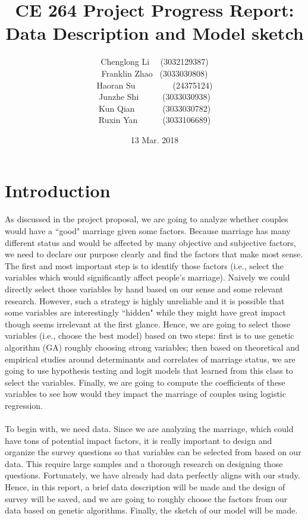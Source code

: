 \documentclass[12pt]{article}
\title{CE 264 Project Progress Report:\\ Data Description and Model sketch}
\date{13 Mar. 2018}
\author{Chenglong Li \ \ (3032129387)\\Franklin Zhao \ (3033030808)\\Haoran Su\ \ \ \ \ \ \ \ \   (24375124)\\Junzhe Shi \ \ \ \ \ (3033030938)\\Kun Qian \ \ \ \ \ \ (3033030782)\\Ruxin Yan\ \ \ \ \ \ (3033106689)}
\begin{document}
	
	\maketitle
	\renewcommand\theequation{\arabic{equation}}
	\renewcommand{\figurename}{Fig.}
	\onehalfspacing
	
	\section{Introduction}
	As discussed in the project proposal, we are going to analyze whether couples would have a ``good" marriage given some factors. Because marriage has many different status and would be affected by many objective and subjective factors, we need to declare our purpose clearly and find the factors that make most sense. The first and most important step is to identify those factors (i.e., select the variables which would significantly affect people's marriage). Naively we could directly select those variables by hand based on our sense and some relevant research. However, such a strategy is highly unreliable and it is possible that some variables are interestingly ``hidden" while they might have great impact though seems irrelevant at the first glance. Hence, we are going to select those variables (i.e., choose the best model) based on two steps: first is to use genetic algorithm (GA) roughly choosing strong variables; then based on theoretical and empirical studies around determinants and correlates of marriage status, we are going to use hypothesis testing and logit models that learned from this class to select the variables. Finally, we are going to compute the coefficients of these variables to see how would they impact the marriage of couples using logistic regression.\\\\
	\noindent To begin with, we need data. Since we are analyzing the marriage, which could have tons of potential impact factors, it is really important to design and organize the survey questions so that variables can be selected from based on our data. This require large samples and a thorough research on designing those questions. Fortunately, we have already had data perfectly aligns with our study. Hence, in this report, a brief data description will be made and the design of survey will be saved, and we are going to roughly choose the factors from our data based on genetic algorithms. Finally, the sketch of our model will be made.
	
\end{document}
